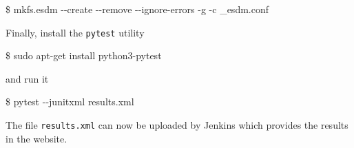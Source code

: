 \begin{framed}
\$ mkfs.esdm {-}{-}create {-}{-}remove {-}{-}ignore-errors -g -c \_esdm.conf
\end{framed}

Finally, install the \texttt{pytest} utility

\begin{framed}
\$ sudo apt-get install python3-pytest
\end{framed}

and run it

\begin{framed}
\$ pytest {-}{-}junitxml results.xml
\end{framed}

The file \texttt{results.xml} can now be uploaded by Jenkins which provides the results in the website.

\begin{comment}

PLEASE, CHECK

\section{Tests in C}

I have nothing else to report here. I don't have access from home.

I created a directory libsrcesdm\_test/Jenkins with the C files and a README with information about the scripts. However, without the output, is pointless to insert the information in the text.

\end{comment}
